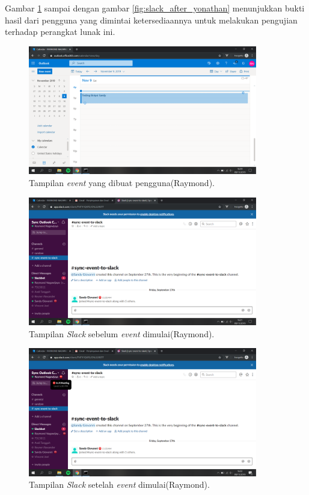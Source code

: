 Gambar \ref{fig:outlook_raymond} sampai dengan gambar \ref{fig:slack_after_yonathan} menunjukkan bukti hasil dari pengguna yang dimintai ketersediaannya untuk melakukan pengujian terhadap perangkat lunak ini. 

\begin{figure}[h]
  \includegraphics[width=10cm]{./Gambar/PengujianRaymond/Outlook.png}
  \centering
  \caption{Tampilan \textit{event} yang dibuat pengguna(Raymond).}
  \label{fig:outlook_raymond}
\end{figure}

\begin{figure}[h]
  \includegraphics[width=10cm]{./Gambar/PengujianRaymond/Slack_Before.png}
  \centering
  \caption{Tampilan \textit{Slack} sebelum \textit{event} dimulai(Raymond).}
  \label{fig:slack_before_raymond}
\end{figure}

\begin{figure}[h]
  \includegraphics[width=10cm]{./Gambar/PengujianRaymond/Slack_After.png}
  \centering
  \caption{Tampilan \textit{Slack} setelah \textit{event} dimulai(Raymond).}
  \label{fig:slack_after_raymond}
\end{figure}

